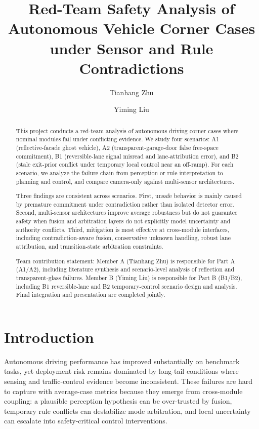 \documentclass[sigconf,nonacm]{acmart}
\title{Red-Team Safety Analysis of Autonomous Vehicle Corner Cases under Sensor and Rule Contradictions}
\author{Tianhang Zhu}
\affiliation{
  \institution{Robert R. McCormick School of Engineering and Applied Science, Northwestern University}
  \country{USA}
}
\author{Yiming Liu}
\affiliation{
  \institution{Robert R. McCormick School of Engineering and Applied Science, Northwestern University}
  \country{USA}
}
\begin{document}
\begin{abstract}
This project conducts a red-team analysis of autonomous driving corner cases where nominal modules fail under conflicting evidence. We study four scenarios: A1 (reflective-facade ghost vehicle), A2 (transparent-garage-door false free-space commitment), B1 (reversible-lane signal misread and lane-attribution error), and B2 (stale exit-prior conflict under temporary local control near an off-ramp). For each scenario, we analyze the failure chain from perception or rule interpretation to planning and control, and compare camera-only against multi-sensor architectures.

Three findings are consistent across scenarios. First, unsafe behavior is mainly caused by premature commitment under contradiction rather than isolated detector error. Second, multi-sensor architectures improve average robustness but do not guarantee safety when fusion and arbitration layers do not explicitly model uncertainty and authority conflicts. Third, mitigation is most effective at cross-module interfaces, including contradiction-aware fusion, conservative unknown handling, robust lane attribution, and transition-state arbitration constraints.

Team contribution statement: Member A (Tianhang Zhu) is responsible for Part A (A1/A2), including literature synthesis and scenario-level analysis of reflection and transparent-glass failures. Member B (Yiming Liu) is responsible for Part B (B1/B2), including B1 reversible-lane and B2 temporary-control scenario design and analysis. Final integration and presentation are completed jointly.
\end{abstract}

\maketitle

\section{Introduction}

Autonomous driving performance has improved substantially on benchmark tasks, yet deployment risk remains dominated by long-tail conditions where sensing and traffic-control evidence become inconsistent. These failures are hard to capture with average-case metrics because they emerge from cross-module coupling: a plausible perception hypothesis can be over-trusted by fusion, temporary rule conflicts can destabilize mode arbitration, and local uncertainty can escalate into safety-critical control interventions.
\end{document}
